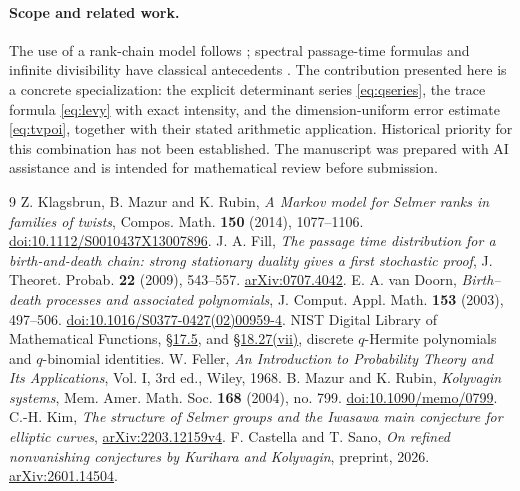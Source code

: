 \documentclass[11pt]{article}
\theoremstyle{definition}\newtheorem{definition}[theorem]{Definition}
\begin{document}
\paragraph{Scope and related work.} The use of a rank-chain model follows \cite{KMR}; spectral passage-time formulas and infinite divisibility have classical antecedents \cite{Fill,VanDoorn,Feller}. The contribution presented here is a concrete specialization: the explicit determinant series \eqref{eq:qseries}, the trace formula \eqref{eq:levy} with exact intensity, and the dimension-uniform error estimate \eqref{eq:tvpoi}, together with their stated arithmetic application. Historical priority for this combination has not been established. The manuscript was prepared with AI assistance and is intended for mathematical review before submission.

\begin{thebibliography}{9}
 Z. Klagsbrun, B. Mazur and K. Rubin, \emph{A Markov model for Selmer ranks in families of twists}, Compos. Math. \textbf{150} (2014), 1077--1106. \href{https://doi.org/10.1112/S0010437X13007896}{doi:10.1112/S0010437X13007896}.
 J. A. Fill, \emph{The passage time distribution for a birth-and-death chain: strong stationary duality gives a first stochastic proof}, J. Theoret. Probab. \textbf{22} (2009), 543--557. \href{https://arxiv.org/abs/0707.4042}{arXiv:0707.4042}.
 E. A. van Doorn, \emph{Birth--death processes and associated polynomials}, J. Comput. Appl. Math. \textbf{153} (2003), 497--506. \href{https://doi.org/10.1016/S0377-0427(02)00959-4}{doi:10.1016/S0377-0427(02)00959-4}.
 NIST Digital Library of Mathematical Functions, \href{https://dlmf.nist.gov/17.5}{\S17.5}, and \href{https://dlmf.nist.gov/18.27}{\S18.27(vii)}, discrete $q$-Hermite polynomials and $q$-binomial identities.
 W. Feller, \emph{An Introduction to Probability Theory and Its Applications}, Vol. I, 3rd ed., Wiley, 1968.
 B. Mazur and K. Rubin, \emph{Kolyvagin systems}, Mem. Amer. Math. Soc. \textbf{168} (2004), no. 799. \href{https://doi.org/10.1090/memo/0799}{doi:10.1090/memo/0799}.
 C.-H. Kim, \emph{The structure of Selmer groups and the Iwasawa main conjecture for elliptic curves}, \href{https://arxiv.org/abs/2203.12159v4}{arXiv:2203.12159v4}.
 F. Castella and T. Sano, \emph{On refined nonvanishing conjectures by Kurihara and Kolyvagin}, preprint, 2026. \href{https://arxiv.org/abs/2601.14504}{arXiv:2601.14504}.
\end{thebibliography}
\end{document}
